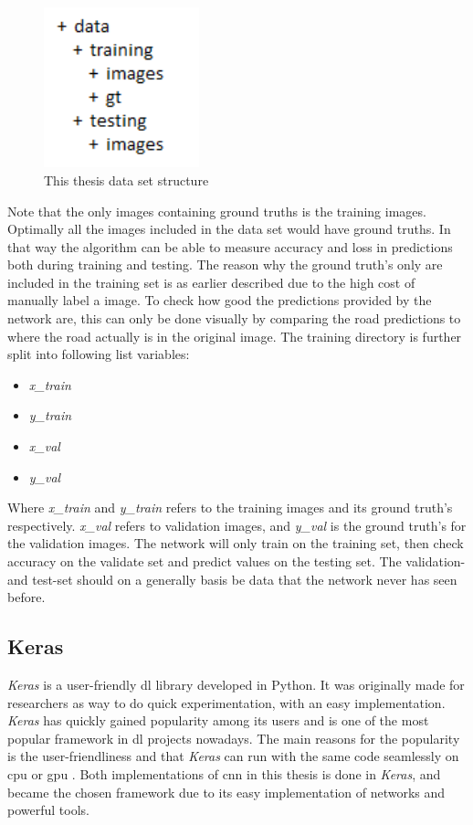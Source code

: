 \documentclass[USenglish]{ifimaster}  %
\begin{document}
\begin{figure}[ht]
    \centering
    \includegraphics[width=0.4\textwidth]{bilder/dataset_structure.PNG}
    \caption{This thesis data set structure}
    \label{fig:dataset_structure}
\end{figure}

Note that the only images containing ground truths is the training images. Optimally all the images included in the data set would have ground truths. In that way the algorithm can be able to measure accuracy and loss in predictions both during training and testing. The reason why the ground truth's only are included in the training set is as earlier described due to the high cost of manually label a image. To check how good the predictions provided by the network are, this can only be done visually by comparing the road predictions to where the road actually is in the original image.
\newline
\newline
The training directory is further split into following list variables:
\begin{itemize}
    \item \textit{x\_train}
    \item \textit{y\_train}
    \item \textit{x\_val}
    \item \textit{y\_val}
\end{itemize}
Where \textit{x\_train} and \textit{y\_train} refers to the training images and its ground truth's respectively. \textit{x\_val} refers to validation images, and \textit{y\_val} is the ground truth's for the validation images. The network will only train on the training set, then check accuracy on the validate set and predict values on the testing set. The validation- and test-set should on a generally basis be data that the network never has seen before.  

\subsection{Keras}
\textit{Keras} is a user-friendly \ac{dl} library developed in Python. It was originally made for researchers as way to do quick experimentation, with an easy implementation. \textit{Keras} has quickly gained popularity among its users and is one of the most popular framework in \ac{dl} projects nowadays. The main reasons for the popularity is the user-friendliness and that \textit{Keras} can run with the same code seamlessly on \ac{cpu} or \ac{gpu} \cite{Francois_Deep_learning_with_python}. Both implementations of \ac{cnn} in this thesis is done in \textit{Keras}, and became the chosen framework due to its easy implementation of networks and powerful tools.
\end{document}
